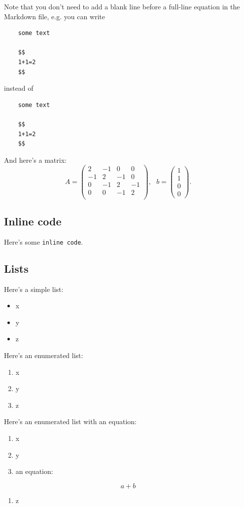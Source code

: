 \documentclass[11pt,letterpaper]{article}
\begin{document}
Note that you don't need to add a blank line before a full-line equation in the Markdown file, e.g. you can write
\begin{lstlisting}
    some text
    
    $$
    1+1=2
    $$
\end{lstlisting}
instead of
\begin{lstlisting}
    some text
    
    $$
    1+1=2
    $$
\end{lstlisting}
And here's a matrix:
\begin{equation}
    A = 
    \begin{pmatrix}
        2 & -1 &  0 & 0 \\
        -1 &  2 & -1 & 0 \\
        0 & -1 &  2 & -1 \\
        0 &  0 & -1 & 2 \\
    \end{pmatrix},~~~
    b = 
    \begin{pmatrix}
        1 \\ 1 \\ 0 \\ 0
    \end{pmatrix}.
\end{equation}

\subsection{Inline code}
Here's some \texttt{inline code}.

\subsection{Lists}
Here's a simple list:
\begin{itemize}
    \item x
    \item y
    \item z
\end{itemize}
Here's an enumerated list:
\begin{enumerate}
    \item x
    \item y
    \item z
\end{enumerate}
Here's an enumerated list with an equation:
\begin{enumerate}
    \item x
    \item y
    \item an equation:
\end{enumerate}
\begin{equation}
    a+b
\end{equation}
\begin{enumerate}
    \def\labelenumi{\arabic{enumi}.}
    \setcounter{enumi}{3}
    \item z
\end{enumerate}
\end{document}
